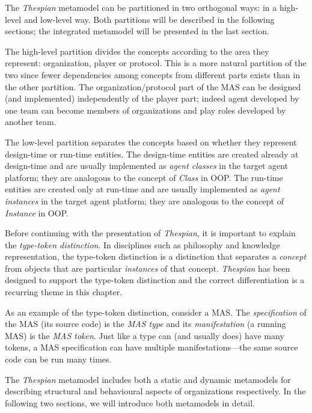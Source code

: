 The \textit{Thespian} metamodel can be partitioned in two orthogonal ways: in a high-level and low-level way.
Both partitions will be described in the following sections; the integrated metamodel will be presented in the last section.

The high-level partition divides the concepts according to the area they represent: organization, player or protocol.
This is a more natural partition of the two since fewer dependencies among concepts from different parts exists than in the other partition.
The organization/protocol part of the MAS can be designed (and implemented) independently of the player part; indeed agent developed by one team can become members of organizations and play roles developed by another team. 

The low-level partition separates the concepts based on whether they represent design-time or run-time entities.
The design-time entities are created already at design-time and are usually implemented as \textit{agent classes} in the target agent platform; they are analogous to the concept of \textit{Class} in OOP.
The run-time entities are created only at run-time and are usually implemented as \textit{agent instances} in the target agent platform; they are analogous to the concept of \textit{Instance} in OOP.

Before continuing with the presentation of \textit{Thespian}, it is important to explain the \textit{type-token distinction}.
In disciplines such as philosophy and knowledge representation, the type-token distinction is a distinction that separates a \textit{concept} from objects that are particular \textit{instances} of that concept.
\textit{Thespian} has been designed to support the type-token distinction and the correct differentiation is a recurring theme in this chapter.

As an example of the type-token distinction, consider a MAS.
The \textit{specification} of the MAS (its source code) is the \textit{MAS type} and its \textit{manifestation} (a running MAS) is the \textit{MAS token}.
Just like a type can (and usually does) have many tokens, a MAS specification can have multiple manifestations---the same source code can be run many times.

The \textit{Thespian} metamodel includes both a static and dynamic metamodels for describing structural and behavioural aspects of organizations respectively.
In the following two sections, we will introduce both metamodels in detail.



